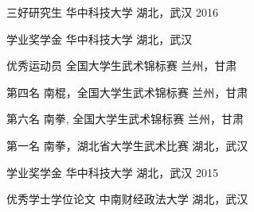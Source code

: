 


\vspace{-1.5mm}
\begin{cvhonors}


\cvhonor
{三好研究生} %
{华中科技大学} %
{湖北，武汉} %
{2016} %


\cvhonor
{学业奖学金} %
{华中科技大学} %
{湖北，武汉} %
{ } %


\cvhonor
{优秀运动员} %
{全国大学生武术锦标赛} %
{兰州，甘肃} %
{ } %


\cvhonor
{第四名} %
{南棍，全国大学生武术锦标赛} %
{兰州，甘肃} %
{ } %


\cvhonor
{第六名} %
{南拳, 全国大学生武术锦标赛} %
{兰州，甘肃} %
{ } %


\cvhonor
{第一名} %
{南拳，湖北省大学生武术比赛} %
{湖北，武汉} %
{ } %


\cvhonor
{学业奖学金} %
{华中科技大学} %
{湖北，武汉} %
{2015} %


\cvhonor
{优秀学士学位论文} %
{中南财经政法大学} %
{湖北，武汉} %
{ } %




\end{cvhonors}
